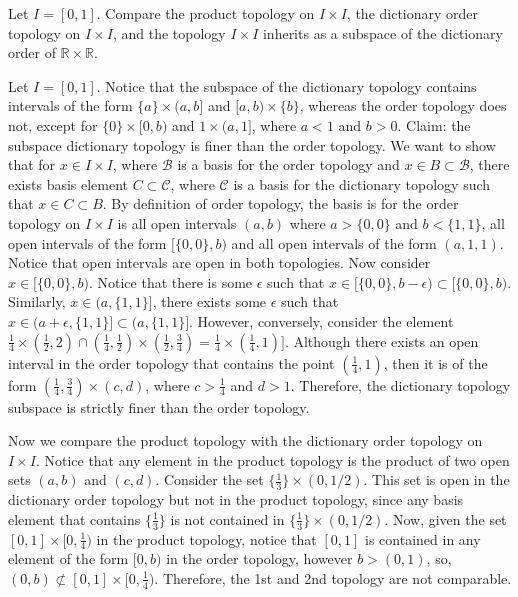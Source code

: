 \documentclass[12pt]{article}
\newenvironment{problem}[2][Problem]
{
	\begin{trivlist} 
		\item[\hskip \labelsep {\bfseries #1 #2:}]
	}
{
	\end{trivlist}
	}
\newenvironment{solution}[1][Solution]
{
	\begin{trivlist} 
		\item[\hskip \labelsep {\itshape #1:}]
	}
	{
	\end{trivlist}
}
\begin{document}
\begin{problem}[Exercise]{2.16.10}
	Let $I = [0,1]$. Compare the product topology on $I \times I$, the dictionary order topology on $I\times I$, and the topology $I \times I$ inherits as a subspace of the dictionary order of $\mathbb{R} \times \mathbb{R}$. 
\end{problem}
\begin{solution}
	Let $I = [0,1]$. Notice that the subspace of the dictionary topology contains intervals of the form $\lbrace{a\rbrace} \times (a, b]$ and $[a, b) \times \lbrace{b\rbrace}$, whereas the order topology does not, except for $\lbrace{0\rbrace} \times [0, b)$ and ${1} \times (a, 1]$, where $a < 1$ and $b > 0$. Claim: the subspace dictionary topology is finer than the order topology. We want to show that for $x \in I \times I$, where $\mathcal{B}$ is a basis for the order topology and $x \in B \subset \mathcal{B}$, there exists basis element $C \subset \mathcal{C}$, where $\mathcal{C}$ is a basis for the dictionary topology such that $x \in C \subset B$. By definition of order topology, the basis is for the order topology on $I \times I$ is all open intervals $(a,b)$ where $a > \lbrace{0,0\rbrace}$ and $b < \lbrace{1,1\rbrace}$, all open intervals of the form $[\lbrace{0,0\rbrace}, b)$ and all open intervals of the form $(a, {1,1})$. Notice that open intervals are open in both topologies. Now consider $x \in [\lbrace{0,0\rbrace}, b)$. Notice that there is some $\epsilon$ such that $x \in [\lbrace{0,0\rbrace}, b-\epsilon) \subset [\lbrace{0,0\rbrace}, b)$.  Similarly, $x \in (a, \lbrace{1,1\rbrace}]$, there exists some $\epsilon$ such that $x \in (a + \epsilon, \lbrace{1,1\rbrace}] \subset (a, \lbrace{1,1\rbrace}]$. However, conversely, consider the element ${\frac{1}{4}} \times (\frac{1}{2}, 2) \cap (\frac{1}{4}, \frac{1}{2}) \times (\frac{1}{2}, \frac{3}{4}) = \frac{1}{4} \times (\frac{1}{4}, 1)]$. Although there exists an open interval in the order topology that contains the point $(\frac{1}{4}, 1)$, then it is of the form $(\frac{1}{4}, \frac{3}{4}) \times (c,d)$, where $c > \frac{1}{4}$ and $d > 1$. Therefore, the dictionary topology subspace is strictly finer than the order topology. \\
	\par Now we compare the product topology with the dictionary order topology on $I \times I$. Notice that any element in the product topology is the product of two open sets $(a,b)$ and $(c,d)$. Consider the set $\lbrace{\frac{1}{3}\rbrace} \times (0, 1/2)$. This set is open in the dictionary order topology but not in the product topology, since any basis element that contains $\lbrace{\frac{1}{3} \rbrace}$ is not contained in $\lbrace{\frac{1}{3}\rbrace} \times (0, 1/2)$. Now, given the set $[0,1] \times [0,\frac{1}{4})$ in the product topology, notice that $[0,1]$ is contained in any element of the form $[0, b)$ in the order topology, however $b > (0,1)$, so, $(0,b) \not\subset [0,1] \times [0,\frac{1}{4})$. Therefore, the 1st and 2nd topology are not comparable. \\

\end{solution}
\end{document}
